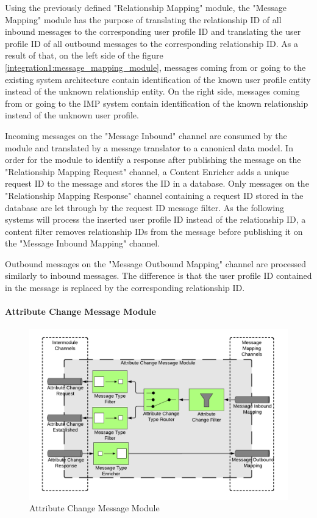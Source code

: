 Using the previously defined "Relationship Mapping" module, the "Message Mapping" module has the purpose of translating the relationship ID of all inbound messages to the corresponding user profile ID and translating the user profile ID of all outbound messages to the corresponding relationship ID. As a result of that, on the left side of the figure \ref{integration1:message_mapping_module}, messages coming from or going to the existing system architecture contain identification of the known user profile entity instead of the unknown relationship entity. On the right side, messages coming from or going to the IMP system contain identification of the known relationship instead of the unknown user profile.

Incoming messages on the "Message Inbound" channel are consumed by the module and translated by a message translator to a canonical data model. In order for the module to identify a response after publishing the message on the "Relationship Mapping Request" channel, a Content Enricher adds a unique request ID to the message and stores the ID in a database. Only messages on the "Relationship Mapping Response" channel containing a request ID stored in the database are let through by the request ID message filter. As the following systems will process the inserted user profile ID instead of the relationship ID, a content filter removes relationship IDs from the message before publishing it on the "Message Inbound Mapping" channel.

Outbound messages on the "Message Outbound Mapping" channel are processed similarly to inbound messages. The difference is that the user profile ID contained in the message is replaced by the corresponding relationship ID.

\paragraph{Attribute Change Message Module}

\begin{figure}[h!]
    \centering
    \includegraphics[scale=0.6]{Diagrams/Integration Architecture 1/Technological Integration/11. Attribute Change Message Module.pdf}
    \caption{Attribute Change Message Module}
    \label{integration1:attribute_change_message_module}
\end{figure}

